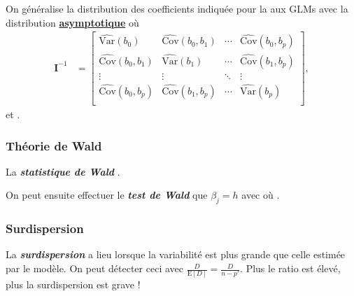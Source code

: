 \documentclass[french]{article}
\begin{document}
\begin{multicols*}{2}
On généralise la distribution des coefficients indiquée pour la \textit{\underline{}} aux GLMs avec la distribution \textbf{\underline{asymptotique}}  où
\begin{align*}
	\bm{I}^{-1}
	&=	\begin{bmatrix}
		\widehat{\text{Var}}(b_{0})	&	\widehat{\text{Cov}}(b_{0}, b_{1})	&	\cdots	&	\widehat{\text{Cov}}(b_{0}, b_{p})	\\
		\widehat{\text{Cov}}(b_{0}, b_{1})	&	\widehat{\text{Var}}(b_{1})	&	\cdots	&	\widehat{\text{Cov}}(b_{1}, b_{p})	\\
		\vdots	&	\vdots	&	\ddots	&	\vdots	\\
		\widehat{\text{Cov}}(b_{0}, b_{p})	&	\widehat{\text{Cov}}(b_{1}, b_{p})	&	\cdots	&	\widehat{\text{Var}}(b_{p})	\\
		\end{bmatrix},
\end{align*}
et .

\bigskip

\subsubsection{Théorie de Wald}
\begin{definitionNOHFILL}
La \textbf{\textit{statistique de Wald}} . 

\bigskip

On peut ensuite effectuer le \textbf{\textit{test de Wald}} que $\beta_{j} = h$ avec  où .
\end{definitionNOHFILL}


\subsubsection{Surdispersion}
\begin{rappel_enhanced}[Contexte]
La \textbf{\textit{surdispersion}} a lieu lorsque la variabilité est plus grande que celle estimée par le modèle. On peut détecter ceci avec $\frac{D}{\text{E}[D]} = \frac{D}{n - p'}$. Plus le ratio est élevé, plus la surdispersion est grave !
\end{rappel_enhanced}


\end{multicols*}
\end{document}
